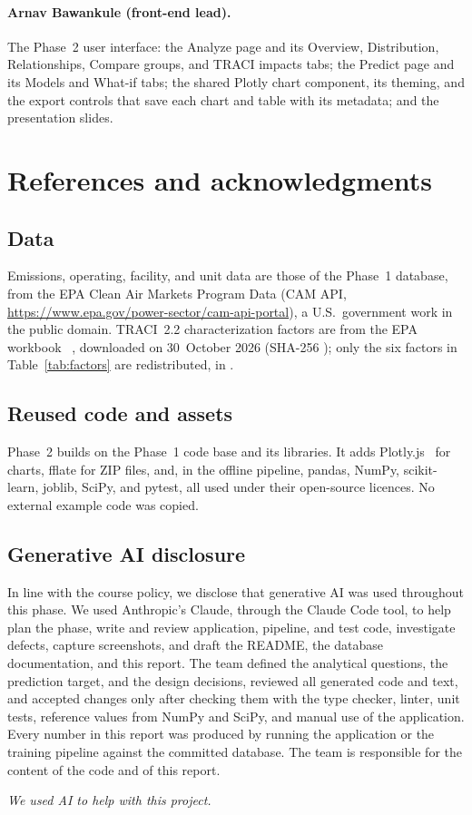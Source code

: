 \documentclass[11pt,a4paper]{article}
\begin{document}
\paragraph{Arnav Bawankule (front-end lead).} The Phase~2 user interface: the Analyze page and
its Overview, Distribution, Relationships, Compare groups, and TRACI impacts tabs; the Predict
page and its Models and What-if tabs; the shared Plotly chart component, its theming, and the export
controls that save each chart and table with its metadata; and the presentation slides.

\section{References and acknowledgments}
\label{sec:references}

\subsection{Data}

Emissions, operating, facility, and unit data are those of the Phase~1 database, from the EPA
Clean Air Markets Program Data (CAM API, \url{https://www.epa.gov/power-sector/cam-api-portal}),
a U.S.\ government work in the public domain. TRACI~2.2 characterization factors are from the
EPA workbook ~\cite{epa2022traci22}, downloaded on 30~October 2026
(SHA-256 ); only the six factors in Table~\ref{tab:factors} are
redistributed, in .

\subsection{Reused code and assets}

Phase~2 builds on the Phase~1 code base and its libraries. It adds Plotly.js~\cite{plotly} for
charts, fflate for ZIP files, and, in the offline pipeline, pandas, NumPy, scikit-learn, joblib,
SciPy, and pytest, all used under their open-source licences. No external example code was
copied.

\subsection{Generative AI disclosure}

In line with the course policy, we disclose that generative AI was used throughout this phase.
We used Anthropic's Claude, through the Claude Code tool, to help plan the phase, write and
review application, pipeline, and test code, investigate defects, capture screenshots, and draft
the README, the database documentation, and this report. The team defined the analytical
questions, the prediction target, and the design decisions, reviewed all generated code and
text, and accepted changes only after checking them with the type checker, linter, unit tests,
reference values from NumPy and SciPy, and manual use of the application. Every number in this
report was produced by running the application or the training pipeline against the committed
database. The team is responsible for the content of the code and of this report.

\renewcommand{\refname}{Bibliography}



\vfill
\noindent\textit{We used AI to help with this project.}
\end{document}
